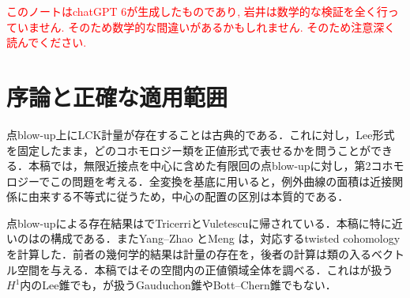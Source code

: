 \documentclass[12pt]{amsart}
\theoremstyle{definition}
\theoremstyle{remark}
\numberwithin{equation}{section}
\newcommand{\xr}[1]{\textcolor{red}{#1}}
\begin{document}
\begin{abstract}
twisted-exactな局所共形K\"ahler形式を持つコンパクト複素曲面に対し，有限回の点blow-up後の，Lee形式を固定した正値錐の例外部分を決定する．例外因子の全変換を基底とすると，類$-\sum_i a_i e_i$が正値代表を持つための必要十分条件は，各$i$について$a_i>\sum_{j\succ i}a_j$となることである．ここで$j\succ i$は近接関係を表す．元の第2 Morse--Novikovコホモロジーが消滅するとき，これは正値錐全体を記述し，特にコンパクトVaisman曲面のLee類に適用できる．既約例外曲線の面積には任意の正の値を指定でき，その類とLee形式を固定したまま全体積を非有界にできる．証明は古典的な相対ample性，局所化した曲率，exactな正値背景形式を組み合わせる．これらの手法が既知であることを明記する．錐全体の記述を限定的な新規候補として提示するが，優先性の確定は主張しない．一般のnon-exactな背景と，高次元の数値的判定は本稿では解決しない．
\end{abstract}
\maketitle
\xr{このノートはchatGPT 6が生成したものであり, 岩井は数学的な検証を全く行っていません. そのため数学的な間違いがあるかもしれません. そのため注意深く読んでください.}
\tableofcontents
\clearpage

\section{序論と正確な適用範囲}\label{sec:intro}
点blow-up上にLCK計量が存在することは古典的である．これに対し，Lee形式を固定したまま，どのコホモロジー類を正値形式で表せるかを問うことができる．本稿では，無限近接点を中心に含めた有限回の点blow-upに対し，第2コホモロジーでこの問題を考える．全変換を基底に用いると，例外曲線の面積は近接関係に由来する不等式に従うため，中心の配置の区別は本質的である．

点blow-upによる存在結果は\cite[\S1.1]{OVV}でTricerriとVuletescuに帰されている．本稿に特に近いのは\cite[Theorem 2.8 and Lemma 3.4]{OVV}の構成である．またYang--Zhao \cite[Theorem 1.1]{YZ}とMeng \cite[Theorem 1.2]{Meng}は，対応するtwisted cohomologyを計算した．前者の幾何学的結果は計量の存在を，後者の計算は類の入るベクトル空間を与える．本稿ではその空間内の正値領域全体を調べる．これは\cite[\S8]{OVLee}が扱う$H^1$内のLee錐でも，\cite[\S4]{OVBalanced}が扱うGauduchon錐やBott--Chern錐でもない．
\end{document}
